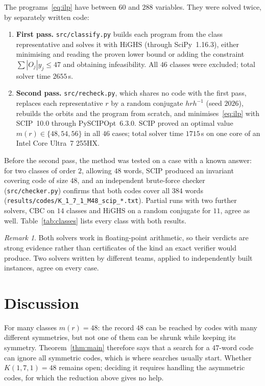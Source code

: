 \documentclass[11pt]{article}
\theoremstyle{definition}
\theoremstyle{remark}
\newtheorem{remark}[theorem]{Remark}
\begin{document}
The programs~\eqref{eq:ilp} have between $60$ and $288$ variables. They were solved twice, by
separately written code:
\begin{enumerate}
\item \textbf{First pass.} \texttt{src/classify.py} builds each program from the class
  representative and solves it with HiGHS (through SciPy~1.16.3), either minimising and reading
  the proven lower bound or adding the constraint $\sum|O_j|y_j\le 47$ and obtaining
  infeasibility. All $46$ classes were excluded; total solver time $2655$\,s.
\item \textbf{Second pass.} \texttt{src/recheck.py}, which shares no code with the first pass,
  replaces each representative $r$ by a random conjugate $hrh^{-1}$ (seed $2026$), rebuilds the
  orbits and the program from scratch, and minimises~\eqref{eq:ilp} with SCIP~10.0
  through PySCIPOpt~6.3.0. SCIP proved an optimal value $m(r)\in\{48,54,56\}$ in all $46$ cases;
  total solver time $1715$\,s on one core of an Intel Core Ultra~7 255HX.
\end{enumerate}
Before the second pass, the method was tested on a case with a known answer: for two classes
of order $2$, allowing $48$ words, SCIP produced an invariant covering code of size $48$, and an
independent brute-force checker (\texttt{src/checker.py}) confirms that both codes cover all
$384$ words (\texttt{results/codes/K\_1\_7\_1\_M48\_scip\_*.txt}). Partial runs with two
further solvers, CBC on $14$ classes and HiGHS on a random conjugate for $11$, agree as well.
Table~\ref{tab:classes} lists every class with both results.

\begin{remark}
Both solvers work in floating-point arithmetic, so their verdicts are strong evidence rather
than certificates of the kind an exact verifier would produce. Two solvers written by different
teams, applied to independently built instances, agree on every case.
\end{remark}

\section{Discussion}

For many classes $m(r)=48$: the record $48$ can be reached by codes with many different
symmetries, but not one of them can be shrunk while keeping its symmetry. Theorem~\ref{thm:main}
therefore says that a search for a $47$-word code can ignore all symmetric codes, which is where
searches usually start. Whether $K(1,7,1)=48$ remains open; deciding it requires handling the
asymmetric codes, for which the reduction above gives no help.
\end{document}
